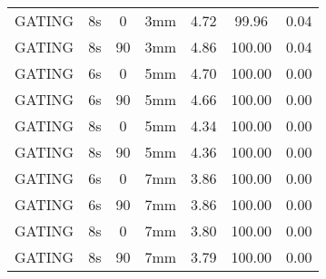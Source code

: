 \begin{table}[H]
\begin{tabular}{|c||c|c|c||c|c|c|}
GATING & 8s & 0 & 3mm & 4.72 & 99.96 & 0.04 \\
GATING & 8s & 90 & 3mm & 4.86 & 100.00 & 0.04 \\
GATING & 6s & 0 & 5mm & 4.70 & 100.00 & 0.00 \\
GATING & 6s & 90 & 5mm & 4.66 & 100.00 & 0.00 \\
GATING & 8s & 0 & 5mm & 4.34 & 100.00 & 0.00 \\
GATING & 8s & 90 & 5mm & 4.36 & 100.00 & 0.00 \\
GATING & 6s & 0 & 7mm & 3.86 & 100.00 & 0.00 \\
GATING & 6s & 90 & 7mm & 3.86 & 100.00 & 0.00 \\
GATING & 8s & 0 & 7mm & 3.80 & 100.00 & 0.00 \\
GATING & 8s & 90 & 7mm & 3.79 & 100.00 & 0.00 \\
    \hline\hline 
  \end{tabular}
\end{table}

\newpage

